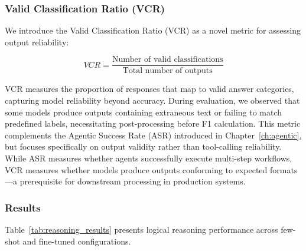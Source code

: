 \subsubsection{Valid Classification Ratio (VCR)}

We introduce the Valid Classification Ratio (VCR) as a novel metric for assessing output reliability:

\begin{equation}
VCR = \frac{\text{Number of valid classifications}}{\text{Total number of outputs}}
\end{equation}

VCR measures the proportion of responses that map to valid answer categories, capturing model reliability beyond accuracy. During evaluation, we observed that some models produce outputs containing extraneous text or failing to match predefined labels, necessitating post-processing before F1 calculation. This metric complements the Agentic Success Rate (ASR) introduced in Chapter~\ref{ch:agentic}, but focuses specifically on output validity rather than tool-calling reliability. While ASR measures whether agents successfully execute multi-step workflows, VCR measures whether models produce outputs conforming to expected formats---a prerequisite for downstream processing in production systems.

\subsubsection{Results}

Table~\ref{tab:reasoning_results} presents logical reasoning performance across few-shot and fine-tuned configurations.

